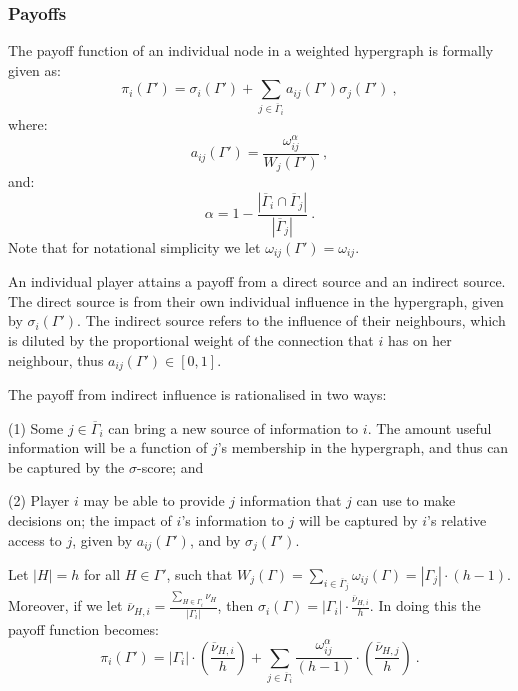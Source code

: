 \documentclass[11pt,fleqn]{article}
\newcounter{llst}
\newenvironment{abet}{\begin{list}{\rm (\alph{llst})}{\usecounter{llst}
\setlength{\itemindent}{0em} \setlength{\leftmargin}{3em}
\setlength{\labelwidth}{2em} \setlength{\labelsep}{1em}}}{\end{list}}
\begin{document}
\subsubsection*{Payoffs}

The payoff function of an individual node in a weighted hypergraph is formally given as:
\begin{equation} \label{payoff1}
\pi_{i}(\Gamma') = \sigma_{i}(\Gamma') + \sum_{j \in \overline{\Gamma}_{i}} a_{ij}(\Gamma') \sigma_{j}(\Gamma') ~ ,
\end{equation}
where:
\begin{equation}
a_{ij}(\Gamma') = \frac{\omega_{ij}^{\alpha}}{W_{j}(\Gamma')} ~ ,
\end{equation}
and:
\begin{equation}
\alpha = 1 - \frac{| \overline{\Gamma}_{i} \cap \overline{\Gamma}_{j} |}{| \overline{\Gamma}_{j} |} ~ .
\end{equation}
Note that for notational simplicity we let $\omega_{ij}(\Gamma') = \omega_{ij}$.

An individual player attains a payoff from a direct source and an indirect source. The direct source is from their own individual influence in the hypergraph, given by $\sigma_{i}(\Gamma')$. The indirect source refers to the influence of their neighbours, which is diluted by the proportional weight of the connection that $i$ has on her neighbour, thus $a_{ij}(\Gamma') \in [0,1]$.

The payoff from indirect influence is rationalised in two ways:
\begin{abet}
	\item[(1)] Some $j \in \overline{\Gamma}_{i}$ can bring a new source of information to $i$. The amount useful information will be a function of $j$'s membership in the hypergraph, and thus can be captured by the $\sigma$-score; and
	
	\item[(2)] Player $i$ may be able to provide $j$ information that $j$ can use to make decisions on; the impact of $i$'s information to $j$ will be captured by $i$'s relative access to $j$, given by $a_{ij}(\Gamma')$, and by $\sigma_{j}(\Gamma')$.
\end{abet}

Let $|H| = h$ for all $H \in \Gamma'$, such that $W_{j}(\Gamma) = \sum_{i \in \overline{\Gamma}_{j}} \omega_{ij} (\Gamma) = |\Gamma_{j}| \cdot (h-1)$. Moreover, if we let $\overline{\nu}_{H,i} = \frac{\sum_{H \in \Gamma_{i}} \nu_{H}}{| \Gamma_{i} |}$, then $\sigma_{i}(\Gamma) = |\Gamma_{i}| \cdot \frac{\overline{\nu}_{H,i}}{h}$. In doing this the payoff function becomes:
\begin{equation} \label{payoff2}
\pi_{i}(\Gamma') = | \Gamma_{i} | \cdot \left( \frac{\overline{\nu}_{H,i}}{h} \right) + \sum_{j \in \overline{\Gamma}_{i}} \frac{\omega_{ij}^{\alpha}}{(h-1)} \cdot \left( \frac{\overline{\nu}_{H,j}}{h} \right) ~ .
\end{equation}
\end{document}
